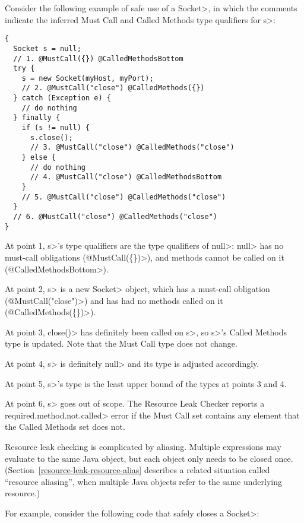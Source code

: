 
Consider the following example of safe use of a \<Socket>, in which the comments indicate the
inferred Must Call and Called Methods type qualifiers for \<s>:
\begin{verbatim}
{
  Socket s = null;
  // 1. @MustCall({}) @CalledMethodsBottom
  try {
    s = new Socket(myHost, myPort);
    // 2. @MustCall("close") @CalledMethods({})
  } catch (Exception e) {
    // do nothing
  } finally {
    if (s != null) {
      s.close();
      // 3. @MustCall("close") @CalledMethods("close")
    } else {
      // do nothing
      // 4. @MustCall("close") @CalledMethodsBottom
    }
    // 5. @MustCall("close") @CalledMethods("close")
  }
  // 6. @MustCall("close") @CalledMethods("close")
}
\end{verbatim}

At point 1, \<s>'s type qualifiers are the type qualifiers of \<null>:
\<null> has no must-call obligations (\<@MustCall(\{\})>),
and methods cannot be called on it (\<@CalledMethodsBottom>).

At point 2, \<s> is a new \<Socket> object, which
has a must-call obligation (\<@MustCall("close")>)
and has had no methods called on it (\<@CalledMethods(\{\})>).

At point 3, \<close()> has definitely been called on \<s>, so
\<s>'s Called Methods type is updated. Note that the Must Call type
does not change.

At point 4, \<s> is definitely \<null> and its type is adjusted accordingly.

At point 5, \<s>'s type is the least upper bound of the types at points 3
and 4.

At point 6, \<s> goes out of scope.  The Resource Leak Checker reports a
\<required.method.not.called> error if the Must Call set contains any
element that the Called Methods set does not.


Resource leak checking is complicated by aliasing.  Multiple expressions
may evaluate to the same Java object, but each object only needs to be
closed once.  (Section~\ref{resource-leak-resource-alias} describes a
related situation called ``resource aliasing'', when multiple Java objects
refer to the same underlying resource.)

For example, consider the following code that safely closes a \<Socket>:

